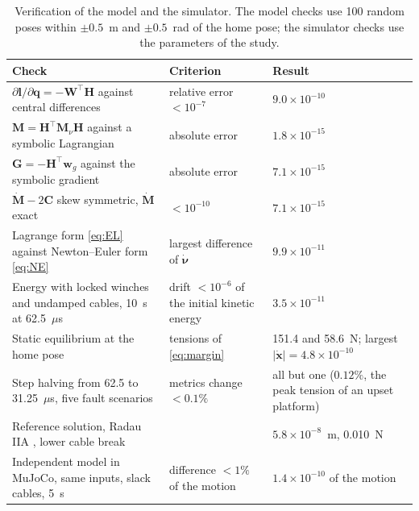 \documentclass[a4paper,fleqn]{cas-dc}
\newcommand{\vc}[1]{\bm{#1}}
\newcommand{\mt}[1]{\mathbf{#1}}
\begin{document}
\begin{table}[h]
\centering\small
\caption{Verification of the model and the simulator. The model checks use 100 random poses within $\pm0.5$~m and $\pm0.5$~rad of the home pose; the simulator checks use the parameters of the study.}\label{tab:verification}
\begin{tabular}{@{}p{}p{}p{}@{}}
\toprule
Check & Criterion & Result\\
\midrule
$\partial\vc l/\partial\vc q=-\mt W^\top\mt H$ against central differences & relative error $<10^{-7}$ & $9.0\times10^{-10}$\\
$\mt M=\mt H^\top\mt M_\nu\mt H$ against a symbolic Lagrangian & absolute error & $1.8\times10^{-15}$\\
$\vc G=-\mt H^\top\vc w_g$ against the symbolic gradient & absolute error & $7.1\times10^{-15}$\\
$\dot{\mt M}-2\mt C$ skew symmetric, $\dot{\mt M}$ exact & $<10^{-10}$ & $7.1\times10^{-15}$\\
Lagrange form \eqref{eq:EL} against Newton--Euler form \eqref{eq:NE} & largest difference of $\dot{\vc\nu}$ & $9.9\times10^{-11}$\\
Energy with locked winches and undamped cables, 10~s at 62.5~$\mu$s & drift $<10^{-6}$ of the initial kinetic energy & $3.5\times10^{-11}$\\
Static equilibrium at the home pose & tensions of \eqref{eq:margin} & 151.4 and 58.6~N; largest $|\dot{\vc x}|=4.8\times10^{-10}$\\
Step halving from 62.5 to 31.25~$\mu$s, five fault scenarios & metrics change $<0.1\%$ & all but one ($0.12\%$, the peak tension of an upset platform)\\
Reference solution, Radau IIA \citep{hairer1996stiff,virtanen2020scipy}, lower cable break & & $5.8\times10^{-8}$~m, 0.010~N\\
Independent model in MuJoCo, same inputs, slack cables, 5~s & difference $<1\%$ of the motion & $1.4\times10^{-10}$ of the motion\\
\bottomrule
\end{tabular}
\end{table}

\FloatBarrier



\end{document}
